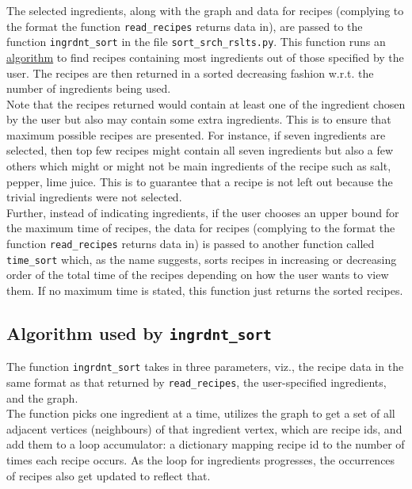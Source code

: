 \documentclass[fontsize=11pt]{article}
\begin{document}
    The selected ingredients, along with the graph and data for recipes (complying to the format the function \texttt{read\_recipes} returns data in), are passed to the function \texttt{ingrdnt\_sort} in the file \texttt{sort\_srch\_rslts.py}. This function runs an \hyperref[sec:algo]{algorithm} to find recipes containing most ingredients out of those specified by the user. The recipes are then returned in a sorted decreasing fashion w.r.t. the number of ingredients being used. \\

    Note that the recipes returned would contain at least one of the ingredient chosen by the user but also may contain some extra ingredients. This is to ensure that maximum possible recipes are presented. For instance, if seven ingredients are selected, then top few recipes might contain all seven ingredients but also a few others which might or might not be main ingredients of the recipe such as salt, pepper, lime juice. This is to guarantee that a recipe is not left out because the trivial ingredients were not selected. \\

    Further, instead of indicating ingredients, if the user chooses an upper bound for the maximum time of recipes, the data for recipes (complying to the format the function \texttt{read\_recipes} returns data in) is passed to another function called \texttt{time\_sort} which, as the name suggests, sorts recipes in increasing or decreasing order of the total time of the recipes depending on how the user wants to view them. If no maximum time is stated, this function just returns the sorted recipes. \\


    \subsection*{Algorithm used by \texttt{ingrdnt\_sort}}
    \label{sec:algo}

    The function \texttt{ingrdnt\_sort} takes in three parameters, viz., the recipe data in the same format as that returned by \texttt{read\_recipes}, the user-specified ingredients, and the graph. \\

    The function picks one ingredient at a time, utilizes the graph to get a set of all adjacent vertices (neighbours) of that ingredient vertex, which are recipe ids, and add them to a loop accumulator: a dictionary mapping recipe id to the number of times each recipe occurs. As the loop for ingredients progresses, the occurrences of recipes also get updated to reflect that. \\
\end{document}

